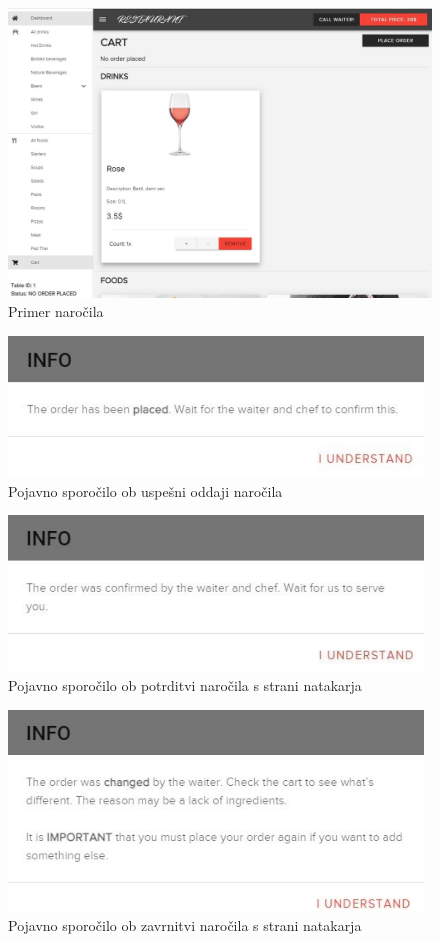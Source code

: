 \documentclass[a4paper, 12pt]{book}
\begin{document}
\begin{figure}[!htb]
\centering
\includegraphics[width=13.7cm]{customer_2.jpg}
\caption{Primer naročila}
\label{Gost_4}
\end{figure}
\begin{figure}[!htb]
\centering
\includegraphics[width=11cm]{gost_5.jpg}
\caption{Pojavno sporočilo ob uspešni oddaji naročila}
\label{Gost_5}
\end{figure}
\begin{figure}[!htb]
\centering
\includegraphics[width=11cm]{gost_6.jpg}
\caption{Pojavno sporočilo ob potrditvi naročila s strani natakarja}
\label{Gost_6}
\end{figure}
\begin{figure}[!htb]
\centering
\includegraphics[width=11cm]{gost_8.jpg}
\caption{Pojavno sporočilo ob zavrnitvi naročila s strani natakarja}
\label{Gost_8}
\end{figure}
\end{document}
